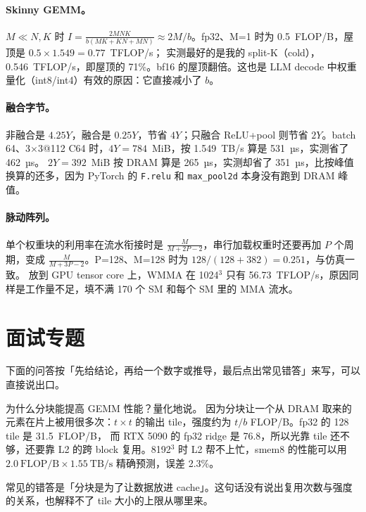 \documentclass[11pt,a4paper]{ctexart}
\begin{document}
\paragraph{Skinny GEMM。} $M\ll N,K$ 时 $I=\frac{2MNK}{b(MK+KN+MN)}\approx 2M/b$。fp32、M=1 时为 0.5~FLOP/B，屋顶是 $0.5\times1.549=0.77$~TFLOP/s；
实测最好的是我的 split-K（cold），0.546~TFLOP/s，即屋顶的 71\%。bf16 的屋顶翻倍。这也是 LLM decode 中权重量化（int8/int4）有效的原因：它直接减小了 $b$。

\paragraph{融合字节。} 非融合是 $4.25Y$，融合是 $0.25Y$，节省 $4Y$；只融合 ReLU+pool 则节省 $2Y$。batch 64、3$\times$3@112 C64 时，$4Y=784$~MiB，按 1.549~TB/s 算是 531~µs，实测省了 462~µs。
$2Y=392$~MiB 按 DRAM 算是 265~µs，实测却省了 351~µs，比按峰值换算的还多，因为 PyTorch 的 \texttt{F.relu} 和 \texttt{max\_pool2d} 本身没有跑到 DRAM 峰值。

\paragraph{脉动阵列。} 单个权重块的利用率在流水衔接时是 $\frac{M}{M+2P-2}$，串行加载权重时还要再加 $P$ 个周期，变成 $\frac{M}{M+3P-2}$。P=128、M=128 时为 $128/(128+382)=0.251$，与仿真一致。
放到 GPU tensor core 上，WMMA 在 1024$^3$ 只有 56.73~TFLOP/s，原因同样是工作量不足，填不满 170 个 SM 和每个 SM 里的 MMA 流水。

\section{面试专题}

下面的问答按「先给结论，再给一个数字或推导，最后点出常见错答」来写，可以直接说出口。

\begin{iqbox}{为什么分块能提高 GEMM 性能？量化地说。}
因为分块让一个从 DRAM 取来的元素在片上被用很多次：$t\times t$ 的输出 tile，强度约为 $t/b$ FLOP/B。fp32 的 128 tile 是 31.5~FLOP/B，
而 RTX 5090 的 fp32 ridge 是 76.8，所以光靠 tile 还不够，还要靠 L2 的跨 block 复用。8192$^3$ 时 L2 帮不上忙，smem8 的性能可以用 $2.0~\text{FLOP/B}\times1.55~\text{TB/s}$ 精确预测，误差 2.3\%。

常见的错答是「分块是为了让数据放进 cache」。这句话没有说出复用次数与强度的关系，也解释不了 tile 大小的上限从哪里来。
\end{iqbox}
\end{document}
